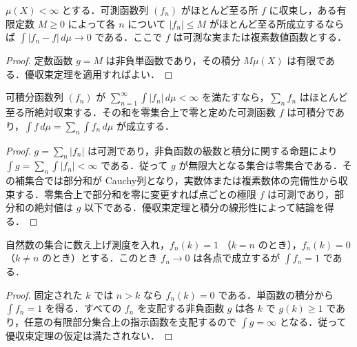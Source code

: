 \begin{prop}[有限測度空間の有界収束定理]
$\mu(X)<\infty$ とする．可測函数列 $(f_n)$ がほとんど至る所 $f$ に収束し，ある有限定数 $M\geq0$ によって各 $n$ について $|f_n|\leq M$ がほとんど至る所成立するならば $\int|f_n-f|\,d\mu\to0$ である．ここで $f$ は可測な実または複素数値函数とする．
\end{prop}
\begin{proof}
定数函数 $g=M$ は非負単函数であり，その積分 $M\mu(X)$ は有限である．優収束定理を適用すればよい．
\end{proof}
\begin{prop}[絶対可積分な級数の項別積分]
可積分函数列 $(f_n)$ が $\sum_{n=1}^\infty\int|f_n|\,d\mu<\infty$ を満たすなら，$\sum_n f_n$ はほとんど至る所絶対収束する．その和を零集合上で零と定めた可測函数 $f$ は可積分であり，$\int f\,d\mu=\sum_n\int f_n\,d\mu$ が成立する．
\end{prop}
\begin{proof}
$g=\sum_n|f_n|$ は可測であり，非負函数の級数と積分に関する命題により $\int g=\sum_n\int|f_n|<\infty$ である．従って $g$ が無限大となる集合は零集合である．その補集合では部分和が Cauchy列となり，実数体または複素数体の完備性から収束する．零集合上で部分和を零に変更すれば点ごとの極限 $f$ は可測であり，部分和の絶対値は $g$ 以下である．優収束定理と積分の線形性によって結論を得る．
\end{proof}
\begin{example}[優函数が存在しない場合の積分と極限]
自然数の集合に数え上げ測度を入れ，$f_n(k)=1$ （$k=n$ のとき），$f_n(k)=0$ （$k\ne n$ のとき）とする．このとき $f_n\to0$ は各点で成立するが $\int f_n=1$ である．
\end{example}
\begin{proof}
固定された $k$ では $n>k$ なら $f_n(k)=0$ である．単函数の積分から $\int f_n=1$ を得る．すべての $f_n$ を支配する非負函数 $g$ は各 $k$ で $g(k)\geq1$ であり，任意の有限部分集合上の指示函数を支配するので $\int g=\infty$ となる．従って優収束定理の仮定は満たされない．
\end{proof}
